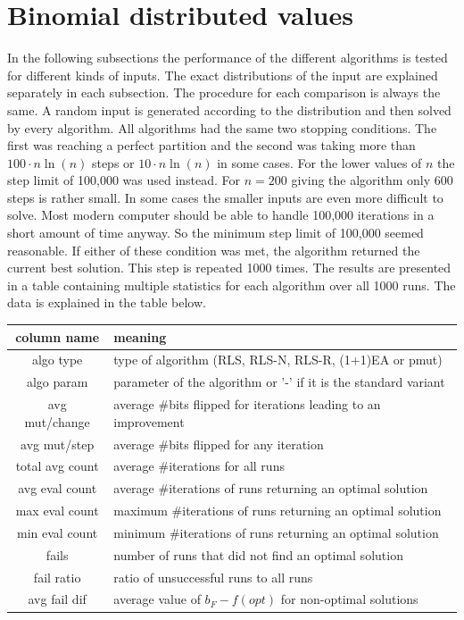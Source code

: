 \section{Binomial distributed values}
In the following subsections the performance of the different algorithms is tested for different kinds of inputs.
The exact distributions of the input are explained separately in each subsection.
The procedure for each comparison is always the same. A random input is generated according to the distribution and then solved by every algorithm.
All algorithms had the same two stopping conditions.
The first was reaching a perfect partition and the second was taking more than $100 \cdot n\ln(n)$ steps or $10 \cdot n\ln(n)$ in some cases.
For the lower values of $n$ the step limit of 100,000 was used instead.
For $n=200$ giving the algorithm only 600 steps is rather small.
In some cases the smaller inputs are even more difficult to solve.
Most modern computer should be able to handle 100,000 iterations in a short amount of time anyway.
So the minimum step limit of 100,000 seemed reasonable.
If either of these condition was met, the algorithm returned the current best solution.
This step is repeated 1000 times.
The results are presented in a table containing multiple statistics for each algorithm over all 1000 runs.
The data is explained in the table below.

\begin{tabular}{c|l}
      column name     & meaning                                                         \\ \hline
      algo type       & type of algorithm (RLS, RLS-N, RLS-R, (1+1)EA or pmut)          \\
      algo param      & parameter of the algorithm or '-' if it is the standard variant \\
      avg mut/change  & average \#bits flipped for iterations leading to an improvement \\
      avg mut/step    & average \#bits flipped for any iteration                        \\ \hline
      total avg count & average \#iterations for all runs                               \\
      avg eval count  & average \#iterations of runs returning an optimal solution      \\
      max eval count  & maximum \#iterations of runs returning an optimal solution      \\
      min eval count  & minimum \#iterations of runs returning an optimal solution      \\ \hline
      fails           & number of runs that did not find an optimal solution            \\
      fail ratio      & ratio of unsuccessful runs to all runs                          \\
      avg fail dif    & average value of $b_F-f(opt)$ for non-optimal solutions         \\
\end{tabular}

